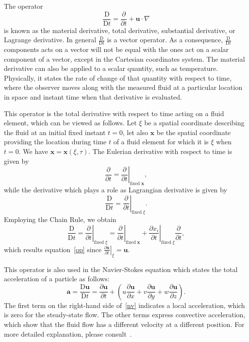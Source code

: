 \documentclass[12pt,a4paper]{report}
\begin{document}
The operator
\begin{equation}
\frac{\mathrm{D}}{\mathrm{D}t} = \frac{\partial}{\partial t} + \mathbf{u}\cdot \nabla  			\label{op}
\end{equation}
is known as the material derivative, total derivative, substantial derivative, or Lagrange derivative. In general $\displaystyle \frac{\mathrm{D}}{\mathrm{D}t}$ is a vector operator. As a consequence, $\displaystyle \frac{\mathrm{D}}{\mathrm{D}t}$ components acts on a vector will not be equal with the ones act on a scalar component of a vector, except in the Cartesian coordinates system. The material derivative can also be applied to a scalar quantity, such as temperature. Physically, it states the rate of change of that quantity with respect to time, where the observer moves along with the measured fluid at a particular location in space and instant time when that derivative is evaluated.

This operator is the total derivative with respect to time acting on a fluid element, which can be viewed as follows. Let $\xi$ be a spatial coordinate describing the fluid at an initial fixed instant $t = 0$, let also $\mathbf{x}$ be the spatial coordinate providing the location during time $t$ of a fluid element for which it is $\xi$ when $t = 0$. We have $\mathbf{x} = \mathbf{x}(\xi,\tau)$. The Eulerian derivative with respect to time is given by
\begin{equation}
\frac{\partial}{\partial t} = \left. \frac{\partial}{\partial t} \right|_{\text{fixed} \; \mathbf{x}},
\end{equation}
while the derivative which plays a role as Lagrangian derivative is given by
\begin{equation}
\frac{\mathrm{D}}{\mathrm{D}t} = \left. \frac{\partial}{\partial t}\right|_{\text{fixed} \; \xi}.
\end{equation}
Employing the Chain Rule, we obtain
\begin{equation*}
\frac{\mathrm{D}}{\mathrm{D}t} 
= \left. \frac{\partial}{\partial t} \right|_{\text{fixed} \; \xi} 
= \left. \frac{\partial}{\partial t} \right|_{\text{fixed} \; \mathbf{x}} + 
  \left. \frac{\partial x_i}{\partial t} \right|_{\text{fixed} \; \xi} \frac{\partial}{\partial t},
\end{equation*}
which results equation~\eqref{op} since $\displaystyle \left. \frac{\partial \mathbf{x}}{\partial t} \right|_{\xi} = \mathbf{u}$.

This operator is also used in the Navier-Stokes equation which states the total acceleration of a particle as follows:
\begin{equation}
\mathbf{a} = \frac{\mathrm{D}\mathbf{u}}{\mathrm{D}t} = 
\frac{\partial \mathbf{u}}{\partial t} + \left(u \frac{\partial \mathbf{u}}{\partial x} + v \frac{\partial \mathbf{u}}{\partial y} + 
w \frac{\partial \mathbf{u}}{\partial z} \right).  			\label{nv}
\end{equation}
The first term on the right-hand side of~\eqref{nv} indicates a local acceleration, which is zero for the steady-state flow. The other terms express convective acceleration, which show that the fluid flow has a different velocity at a different position. For more detailed explanation, please consult~\cite{fac,hwf}.
\end{document}
